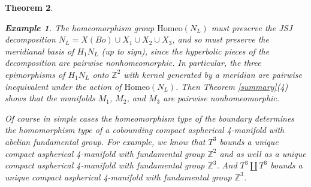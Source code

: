 \documentclass[12pt]{amsart}
\newtheorem{theorem}{Theorem}
\theoremstyle{definition}
\newtheorem{example}[theorem]{Example}
\newcommand{\Z}{\mathbb Z}
\begin{document}
\begin{theorem}
\begin{example}
 The homeomorphism group  $\text{Homeo}(N_L)$ must preserve the JSJ decomposition $N_L = X(Bo) \cup X_1 \cup X_2 \cup X_3$, and so must preserve the meridianal basis of $H_1N_L$ (up to sign), since the hyperbolic pieces of the decomposition are pairwise nonhomeomorphic.   In particular, the three epimorphisms of $H_1N_L$ onto $\Z^2$ with kernel generated by a meridian are pairwise inequivalent under the action of $\text{Homeo}(N_L)$.  Then Theorem \ref{summary}(4) shows that the manifolds $M_1$, $M_2$, and $M_3$ are pairwise nonhomeomorphic.  





Of course  in simple cases  the homeomorphism type of the boundary determines the homomorphism type of a cobounding compact aspherical 4-manifold with abelian fundamental group.   For example, we know that $T^3$ bounds a unique compact aspherical 4-manifold with fundamental group $\Z^2$ and as well as a unique compact aspherical 4-manifold with fundamental group $\Z^3$.   And $T^3 \coprod T^3$ bounds a unique compact aspherical 4-manifold with fundamental group $\Z^3$.


\end{example}


\end{theorem}




{}

\end{document}
